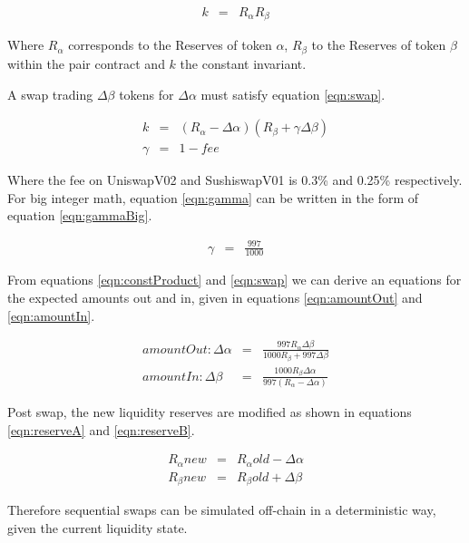 \documentclass[runningheads]{llncs}
\begin{document}
	\begin{eqnarray}
		k  &=& R_{\alpha}  R_{\beta}  \label{eqn:constProduct}
	\end{eqnarray}
	
	Where \(R_{\alpha}\) corresponds to the Reserves of token \(\alpha\), \(R_{\beta}\) to the Reserves of token \(\beta\) within the pair contract and \( k \) the constant invariant. 
	
	A swap trading \( \Delta\beta\) tokens for \( \Delta\alpha \) must satisfy equation \ref{eqn:swap}.
	
	\begin{eqnarray}
		k  &=& (R_{\alpha} - \Delta\alpha)  (R_{\beta} + \gamma\Delta\beta ) \label{eqn:swap}\\
		\gamma  &=& 1 - fee \label{eqn:gamma}
	\end{eqnarray}
	
	Where the fee on UniswapV02 and SushiswapV01 is 0.3\% and 0.25\% respectively. For big integer math, equation \ref{eqn:gamma} can be written in the form of equation \ref{eqn:gammaBig}.
	
	\begin{eqnarray}
		\gamma  &=& \frac{997}{1000} \label{eqn:gammaBig}
	\end{eqnarray}
	
	From equations \ref{eqn:constProduct} and \ref{eqn:swap} we can derive an equations for the expected amounts out and in, given in equations \ref{eqn:amountOut} and \ref{eqn:amountIn}. 
	
	\begin{eqnarray}
		amountOut: \Delta\alpha  &=& \frac{997 R_{\alpha} \Delta\beta }{1000 R_{\beta} + 997 \Delta\beta} \label{eqn:amountOut}\\
		amountIn: \Delta\beta  &=& \frac{1000 R_{\beta} \Delta\alpha }{997 (R_{\alpha} - \Delta\alpha)} \label{eqn:amountIn}
	\end{eqnarray}
	
	Post swap, the new liquidity reserves are modified as shown in equations \ref{eqn:reserveA} and \ref{eqn:reserveB}.
	
	\begin{eqnarray}
		R_{\alpha}{new}  &=& R_{\alpha}{old} - \Delta\alpha  \label{eqn:reserveA}\\
		R_{\beta}{new}  &=& R_{\beta}{old} + \Delta\beta  \label{eqn:reserveB}
	\end{eqnarray}
	
	Therefore sequential swaps can be simulated off-chain in a deterministic way, given the current liquidity state.
	
\end{document}
